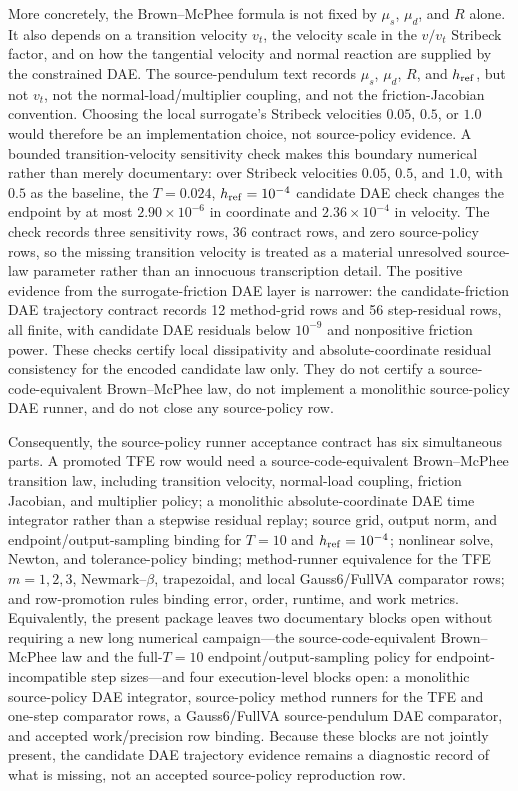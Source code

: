 \documentclass[preprint,12pt]{elsarticle}
\newcommand{\method}{Gauss6\slash FullVA}
\newcommand{\tfe}{TFE}
\begin{document}
\noindent
More concretely, the Brown--McPhee formula is not fixed by
\(\mu_s\), \(\mu_d\), and \(R\) alone.  It also depends on a
transition velocity \(v_t\), the velocity scale in the \(v/v_t\)
Stribeck factor, and on how the tangential velocity and normal reaction
are supplied by the constrained DAE.  The source-pendulum text records
\(\mu_s\), \(\mu_d\), \(R\), and \(h_{\rm ref}\), but not \(v_t\), not
the normal-load/multiplier coupling, and not the friction-Jacobian
convention.  Choosing the local surrogate's Stribeck velocities
\(0.05\), \(0.5\), or \(1.0\) would therefore be an implementation
choice, not source-policy evidence.
A bounded transition-velocity sensitivity check makes this boundary numerical
rather than merely documentary: over Stribeck velocities \(0.05\), \(0.5\),
and \(1.0\), with \(0.5\) as the baseline, the \(T=0.024\),
\(h_{\rm ref}=10^{-4}\) candidate DAE check changes the endpoint by at most
\(2.90\times 10^{-6}\) in coordinate and \(2.36\times 10^{-4}\) in velocity.
The check records three sensitivity rows, 36 contract rows, and zero
source-policy rows, so the missing transition velocity is treated as a
material unresolved source-law parameter rather than an innocuous
transcription detail.
The positive evidence from the surrogate-friction DAE layer is narrower:
the candidate-friction DAE trajectory contract records 12 method-grid rows
and 56 step-residual rows, all finite, with candidate DAE residuals below
\(10^{-9}\) and nonpositive friction power.  These checks certify local
dissipativity and absolute-coordinate residual consistency for the encoded
candidate law only.  They do not certify a source-code-equivalent
Brown--McPhee law, do not implement a monolithic source-policy DAE runner,
and do not close any source-policy row.

Consequently, the source-policy runner acceptance contract has six
simultaneous parts.  A promoted \tfe{} row would need a
source-code-equivalent Brown--McPhee transition law, including transition
velocity, normal-load coupling, friction Jacobian, and multiplier policy; a
monolithic absolute-coordinate DAE time integrator rather than a stepwise
residual replay; source grid, output norm, and endpoint/output-sampling
binding for \(T=10\) and \(h_{\rm ref}=10^{-4}\); nonlinear solve, Newton,
and tolerance-policy binding; method-runner equivalence for the \tfe{}
\(m=1,2,3\), Newmark--\(\beta\), trapezoidal, and local \method{}
comparator rows; and row-promotion rules binding error, order, runtime, and
work metrics.  Equivalently, the present package leaves two documentary
blocks open without requiring a new long numerical campaign---the
source-code-equivalent Brown--McPhee law and the full-\(T=10\)
endpoint/output-sampling policy for endpoint-incompatible step sizes---and
four execution-level blocks open: a monolithic source-policy DAE integrator,
source-policy method runners for the \tfe{} and one-step comparator rows, a
Gauss6/FullVA source-pendulum DAE comparator, and accepted work/precision row
binding.  Because these blocks are not jointly present, the candidate
DAE trajectory evidence remains a diagnostic record of what is missing, not an
accepted source-policy reproduction row.
\end{document}
